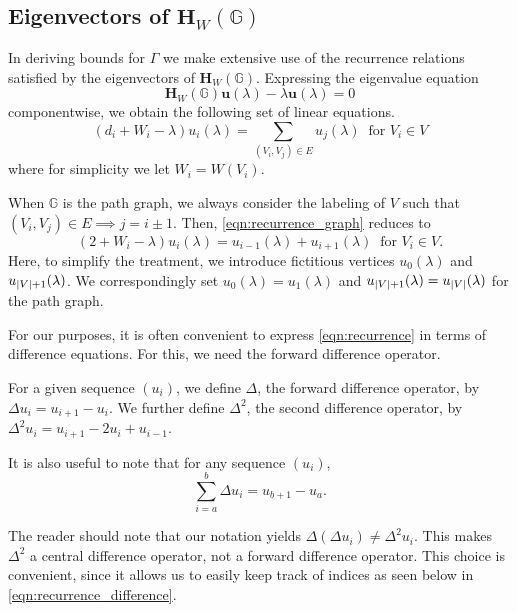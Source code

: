   \subsection{Eigenvectors of $\mathbf{H}_W(\mathbb{G})$}
    In deriving bounds for $\Gamma$ we make extensive use of the recurrence relations satisfied by the eigenvectors of $\mathbf{H}_W(\mathbb{G})$. Expressing the eigenvalue equation
    \begin{equation}
      \mathbf{H}_W(\mathbb{G}) \mathbf{u}(\lambda) - \lambda \mathbf{u}(\lambda)=0
    \end{equation}
    componentwise, we obtain the following set of linear equations.
    \begin{equation}\label{eqn:recurrence_graph}
      (d_i + W_i - \lambda)u_i(\lambda) = \sum_{(V_i,V_j)\in E} u_j(\lambda) \;\; \text{for $V_i \in V$}
    \end{equation}
    where for simplicity we let $W_i = W(V_i)$.

    When $\mathbb{G}$ is the path graph, we always consider the labeling of $V$ such that $(V_i,V_j) \in E \implies j = i\pm1$. Then, \cref{eqn:recurrence_graph} reduces to
    \begin{equation}\label{eqn:recurrence}
      (2 + W_i - \lambda)u_i(\lambda) = u_{i-1}(\lambda) + u_{i+1}(\lambda) \;\; \text{for $V_i \in V$.}
    \end{equation}
    Here, to simplify the treatment, we introduce fictitious vertices $u_0(\lambda)$ and $u_{\left\lvert V \right\rvert+1}(\lambda)$. We correspondingly set $u_0(\lambda)=u_1(\lambda)$ and $u_{\left\lvert V \right\rvert+1}(\lambda)=u_{\left\lvert V \right\rvert}(\lambda)$ for the path graph.

    For our purposes, it is often convenient to express \cref{eqn:recurrence} in terms of difference equations. For this, we need the forward difference operator.
    \begin{definition}\label{def:forward_difference}
      For a given sequence $\left(u_i\right)$, we define $\Delta$, the forward difference operator, by $\Delta u_i = u_{i+1} - u_i$. We further define $\Delta^2$, the second difference operator, by $\Delta^2 u_i = u_{i+1} - 2 u_i + u_{i-1}$.
    \end{definition}
       It is also useful to note that for any sequence $(u_i)$,
      \begin{equation}\label{eqn:forward_sum}
	\sum_{i=a}^b \Delta u_i = u_{b+1} - u_a.
      \end{equation}

    \begin{remark}
      The reader should note that our notation yields $\Delta \left(\Delta u_i \right) \neq \Delta^2 u_i$. This makes $\Delta^2$ a central difference operator, not a forward difference operator. This choice is convenient, since it allows us to easily keep track of indices as seen below in \cref{eqn:recurrence_difference}.
    \end{remark}

